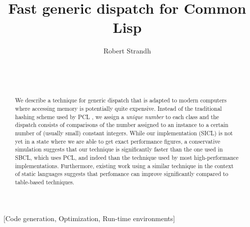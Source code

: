 \documentclass{acm_proc_article-sp}
\def\inputtex#1{}
\begin{document}
\title{Fast generic dispatch for Common Lisp}
\author{\alignauthor
Robert Strandh\\
\\
\\
\\
}

\maketitle

\begin{abstract}
We describe a technique for generic dispatch that is adapted to modern
computers where accessing memory is potentially quite expensive.
Instead of the traditional hashing scheme used by PCL
\cite{Kiczales:1990:EMD:91556.91600}, we assign a \emph{unique number}
to each class and the dispatch consists of comparisons of the number
assigned to an instance to a certain number of (usually small)
constant integers.  While our implementation (SICL) is not yet in a
state where we are able to get exact performance figures, a
conservative simulation suggests that our technique is significantly
faster than the one used in SBCL, which uses PCL, and indeed than the
technique used by most high-performance \cl{} implementations.
Furthermore, existing work \cite{Zendra:1997:EDD:263698.263728} using
a similar technique in the context of static languages suggests that
perfomance can improve significantly compared to table-based
techniques.
\end{abstract}

[Code generation, Optimization, Run-time environments]

\inputtex{sec-introduction.tex}
\inputtex{sec-previous.tex}
\inputtex{sec-our-method.tex}
\inputtex{sec-performance.tex}
\inputtex{sec-conclusions.tex}
\inputtex{sec-acknowledgements.tex}



\end{document}
